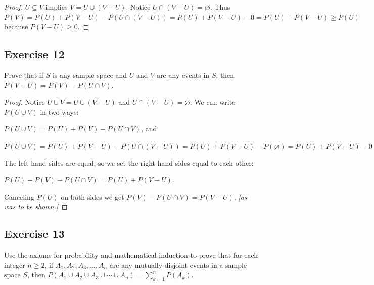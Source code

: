 \documentclass[14pt]{extarticle}
\newcommand{\es}{\varnothing}
\begin{document}
\begin{proof}
\(U \subseteq V\) implies \(V = U \cup (V - U)\). Notice \(U \cap (V - U) = \es\). Thus \(P(V) = P(U) + P(V-U) - P(U \cap 
(V-U)) = P(U) + P(V-U) - 0 = P(U) + P(V-U) \geq P(U)\) because \(P(V-U) \geq 0\).
\end{proof}

\subsection{Exercise 12}
Prove that if \(S\) is any sample space and \(U\) and \(V\) are any events in \(S\), then \(P(V-U) = P(V) - P(U \cap V)\).

\begin{proof}
Notice \(U \cup V = U \cup (V - U)\) and \(U \cap (V-U) = \es\). We can write \(P(U \cup V)\) in two ways:

\(P(U \cup V) = P(U) + P(V) - P(U \cap V)\), and

\(P(U \cup V) = P(U) + P(V-U) - P(U \cap (V-U)) = P(U) + P(V-U) - P(\es) = P(U) + P(V-U) - 0 = P(U) + P(V-U)\)

The left hand sides are equal, so we set the right hand sides equal to each other: 

\(P(U) + P(V) - P(U \cap V) = P(U) + P(V-U)\). 

Canceling \(P(U)\) on both sides we get \(P(V) - P(U \cap V) = P(V-U)\), {\it [as was to be shown.]}
\end{proof}

\subsection{Exercise 13}
Use the axioms for probability and mathematical induction to prove that for each integer \(n \geq 2\), if \(A_1, A_2, A_3,
\ldots, A_n\) are any mutually disjoint events in a sample space \(S\), then \(P(A_1 \cup A_2 \cup A_3 \cup \cdots \cup 
A_n) = \sum_{k=1}^n P(A_k)\).
\end{document}
